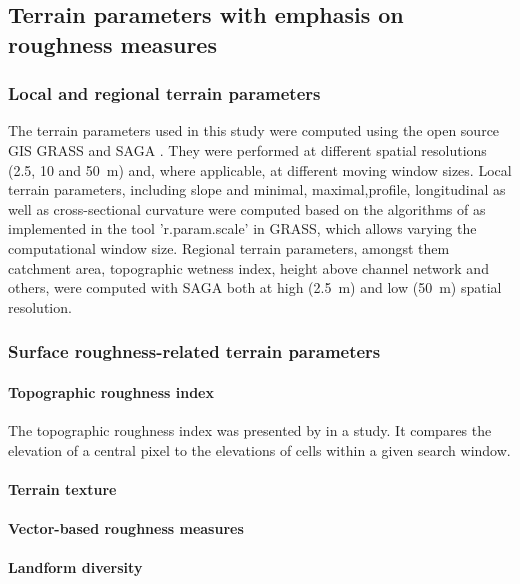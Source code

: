 \documentclass[preprint,12pt,authoryear]{elsarticle}
\begin{document}
\subsection{Terrain parameters with emphasis on roughness measures}
\subsubsection{Local and regional terrain parameters}
The terrain parameters used in this study were computed using the open source GIS GRASS \citep{GRASS} and SAGA \citep{SAGA}. They were performed at different spatial resolutions (2.5, 10 and 50~m) and, where applicable, at different moving window sizes. Local terrain parameters, including slope and minimal, maximal,profile, longitudinal as well as cross-sectional curvature were computed based on the algorithms of \cite{Wood1996} as implemented in the tool 'r.param.scale' in GRASS, which allows varying the computational window size. Regional terrain parameters, amongst them catchment area, topographic wetness index, height above channel network and others, were computed with SAGA both at high (2.5~m) and low (50~m) spatial resolution.  
\subsubsection{Surface roughness-related terrain parameters}
\paragraph{Topographic roughness index} 
The topographic roughness index was presented by  \cite{Riley1999} in a study. It  compares the elevation of a central pixel to the elevations of cells within a given search window. 
\cite{McKean2004}

\paragraph{Terrain texture}

\cite{Iwahashi2007}
\paragraph{Vector-based roughness measures}

\cite{Sappington2007}

\cite{Grohmann2010}
\paragraph{Landform diversity} 
\citep{Jasiewicz2013}
\end{document}
